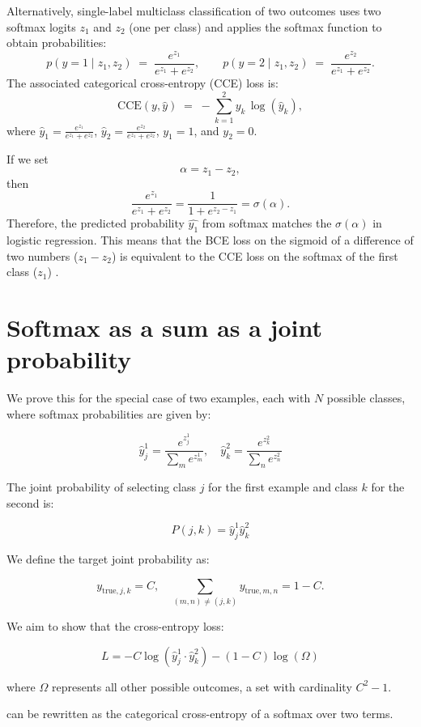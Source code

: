 \documentclass[twoside,11pt]{article}
\begin{document}
Alternatively, single-label multiclass classification of two 
outcomes uses two softmax logits \(z_1\) and \(z_2\) (one per class) 
and applies the softmax function to obtain probabilities:
\[
  p(y=1 \mid z_1, z_2)
  \;=\;
  \frac{e^{z_1}}{e^{z_1} + e^{z_2}},
  \qquad
  p(y=2 \mid z_1, z_2)
  \;=\;
  \frac{e^{z_2}}{e^{z_1} + e^{z_2}}.
\]
The associated categorical cross-entropy (CCE) loss is: 
\[
  \text{CCE}(y, \hat{y})
  \;=\;
  -\sum_{k=1}^2 y_k \,\log (\hat{y}_k ),
\]
where \(\hat{y}_1 = \frac{e^{z_1}}{e^{z_1} + e^{z_2}}\), 
\(\hat{y}_2 = \frac{e^{z_2}}{e^{z_1} + e^{z_2}}\), 
\(y_1 = 1\), and
\(y_2 = 0\). 

If we set 
\[
  \alpha = z_1 - z_2,
\]
then
\[
  \frac{e^{z_1}}{e^{z_1} + e^{z_2}}
  =
  \frac{1}{1 + e^{z_2 - z_1}}
  =
  \sigma(\alpha).
\] 
Therefore, the predicted probability $\hat{y_1}$ from softmax
matches the \(\sigma(\alpha)\) in logistic regression. This means that 
the BCE loss on the sigmoid of a difference of two numbers ($z_1 - z_2$) 
is equivalent
to the CCE loss on the softmax of the first class
($z_1$) \citep{Goodfellow-et-al-2016}.


\section{Softmax as a sum as a joint probability}
\label{app:softmax-sum-joint}

We prove this for the special case of two examples, each with $N$ 
possible classes, where softmax probabilities are given by:

\[
\hat{y}_j^1 = \frac{e^{z_j^1}}{\sum_{m} e^{z_m^1}}, \quad \hat{y}_k^2 = \frac{e^{z_k^2}}{\sum_{n} e^{z_n^2}}
\]

The joint probability of selecting class $j$ for the first example and class $k$ for the second is:

\[
P(j, k) = \hat{y}_j^1 \hat{y}_k^2
\]

We define the target joint probability as:

\[
y_{\text{true}, j, k} 
= 
C, \quad \sum_{(m,n) \neq (j,k)} y_{\text{true}, m, n} = 1 - C.
\]

We aim to show that the cross-entropy loss:

\[
L = - C \log (\hat{y}_j^1 \cdot \hat{y}_k^2) - (1 - C) \log (\Omega)
\]

where $\Omega$ represents all other possible outcomes, 
a set with cardinality $C^2 - 1$.

can be rewritten as the categorical cross-entropy of a softmax over two terms.
\end{document}
